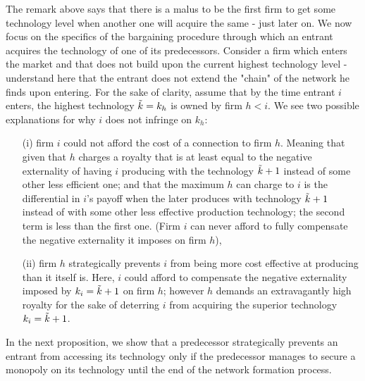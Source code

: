 \documentclass{article}
\begin{document}
The remark above says that there is a malus to be the first firm to get some technology level when another one will acquire the same - just later on. We now focus on the specifics of the bargaining procedure through which an entrant acquires the technology of one of its predecessors. Consider a firm which enters the market and that does not build upon the current highest technology level - understand here that the entrant does not extend the "chain" of the network he finds upon entering. For the sake of clarity, assume that by the time entrant $i$ enters, the highest technology $\Tilde{k}=k_h$ is owned by firm $h<i$. We see two possible explanations for why $i$ does not infringe on $k_h$: 
\begin{enumerate}
    \item[(i)] firm $i$ could not afford the cost of a connection to firm $h$. Meaning that given that $h$ charges a royalty that is at least equal to the negative externality of having $i$ producing with the technology $\Tilde{k}+1$ instead of some other less efficient one; and that the maximum $h$ can charge to $i$ is the differential in $i$'s payoff when the later produces with technology $\Tilde{k}+1$ instead of with some other less effective production technology; the second term is less than the first one. (Firm $i$ can never afford to fully compensate the negative externality it imposes on firm $h$),
    \item[(ii)] firm $h$ strategically prevents $i$ from being more cost effective at producing than it itself is. Here, $i$ could afford to compensate the negative externality imposed by $k_i=\Tilde{k}+1$ on firm $h$; however $h$ demands an extravagantly high royalty for the sake of deterring $i$ from acquiring the superior technology $k_i=\Tilde{k}+1$. 
\end{enumerate}

\indent In the next proposition, we show that a predecessor strategically prevents an entrant from accessing its technology only if the predecessor manages to secure a monopoly on its technology until the end of the network formation process. 
\end{document}

